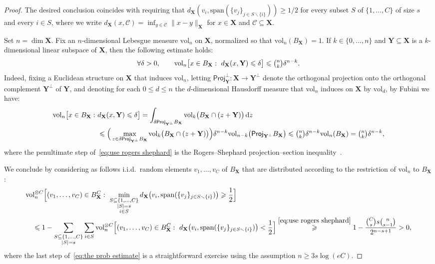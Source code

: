 \documentclass[11pt,reqno]{amsart}
\renewcommand{\le}{\leqslant}
\renewcommand{\ge}{\geqslant}
\renewcommand{\setminus}{\smallsetminus}
\renewcommand{\subset}{\subseteq}
\newcommand{\vol}{\mathrm{vol}}
\renewcommand{\i}{\mathsf{i}}
\newcommand{\X}{\mathbf X}
\newcommand{\Y}{\mathbf Y}
\newcommand{\Proj}{\mathsf{Proj}}
\newcommand{\sub}{\mathscr{C}}
\renewcommand{\d}{\delta}
\newcommand{\ud}[0]{\,\mathrm{d}}
\newcommand{\1}{\mathbf{1}}
\begin{document}
\begin{proof}  The desired conclusion coincides with requiring that  $d_\X(v_i,\mathrm{span}(\{v_j\}_{j\in S\setminus\{i\}}))\ge 1/2$ for every subset $S$ of  $\{1,\ldots,C\}$  of size $s$ and every $i\in S$, where we write $d_\X(x,\sub)=\inf_{y\in \sub} \|x-y\|_\X$ for  $x\in \X$ and $\sub\subset \X$. 


Set $n=\dim \X$. Fix an $n$-dimensional  Lebesgue measure $\vol_n$ on $\X$, normalized so that $\vol_n(B_\X)=1$. If $k\in \{0,\ldots,n\}$ and $\Y\subset \X$ is a $k$-dimensional linear subspace of $\X$, then the following estimate holds:
\begin{equation}\label{eq:neighborhood of subspace}
\forall \d>0,\qquad \vol_n\big[x\in B_\X:\ d_\X(x,\Y)\le \d\big]\le \tbinom{n}{k}\d^{n-k}. 
\end{equation}
Indeed, fixing a Euclidean structure on $\X$ that induces $\vol_n$, letting $\Proj_\Y^\perp:\X\to \Y^\perp$ denote the orthogonal projection onto the orthogonal complement $\Y^\perp$ of $\Y$, and denoting for each $0\le d\le n$ the $d$-dimensional Hausdorff measure that $\vol_n$ induces on $\X$ by $\vol_d$, by Fubini we have:
\begin{align}\label{eq:use rogers shephard}
\begin{split}
\vol_n\big[x\in B_\X:\ &d_\X(x,\Y)\le \d\big]=\int_{\d\Proj_{\Y^\perp}B_\X}\vol_{k} \big(B_\X\cap (z+\Y)\big)\ud z\\&\le 
\Big(\max_{z\in \d\Proj_{\Y^\perp}B_\X} \vol_{k} \big(B_\X\cap (z+\Y)\big)\Big)\d^{n-k}\vol_{n-k}\big(\Proj_{\Y^\perp}B_\X\big)\le \tbinom{n}{k}\d^{n-k}\vol_n(B_\X)=\tbinom{n}{k}\d^{n-k}, 
\end{split}
\end{align}
where the penultimate step of~\eqref{eq:use rogers shephard} is the Rogers--Shephard projection–section inequality~\cite[Theorem~1]{RS58}. 

We conclude  by considering as follows i.i.d.~random elements  $v_1,\ldots,v_C$ of $B_\X$ that are distributed according to the restriction of $\vol_n$ to $B_\X$: 
\begin{align}\label{eq:the prob estimate}
\begin{split}
&\vol_n^{\otimes C} \Big[(v_1,\ldots,v_C)\in B_\X^C:\ \min_{\substack{ S\subset \{1,\ldots, C\}\\ |S|=s\\i\in S}} d_\X\big(v_i,\mathrm{span}(\{v_j\}_{j\in S\setminus \{i\}})\big)\ge \frac12 \Big]\\&\ \ \ \le 1- \sum_{\substack{S\subset \{1,\ldots,C\}\\|S|=s}} \sum_{i\in S}\vol_n^{\otimes C} \Big[(v_1,\ldots,v_C)\in B_\X^C:\ d_\X\big(v_i,\mathrm{span}(\{v_j\}_{j\in S\setminus\{i\}})\big)<\frac12 \Big]\stackrel{\eqref{eq:use rogers shephard}}{\ge} 1- \frac{\tbinom{C}{s}s\tbinom{n}{s-1}}{2^{n-s+1}}>0, 
\end{split}
\end{align}
where the last step of~\eqref{eq:the prob estimate} is a straightforward exercise using the assumption $n\ge 3s\log (eC)$.  
\end{proof}
\end{document}
